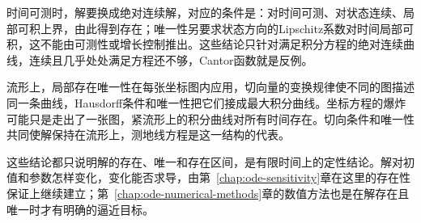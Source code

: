 时间可测时，解要换成绝对连续解，对应的条件是：对时间可测、对状态连续、局部可积上界，由此得到存在；唯一性另要求状态方向的Lipschitz系数对时间局部可积，这不能由可测性或增长控制推出。这些结论只针对满足积分方程的绝对连续曲线，连续且几乎处处满足方程还不够，Cantor函数就是反例。

流形上，局部存在唯一性在每张坐标图内应用，切向量的变换规律使不同的图描述同一条曲线，Hausdorff条件和唯一性把它们接成最大积分曲线。坐标方程的爆炸可能只是走出了一张图，紧流形上的积分曲线对所有时间存在。切向条件和唯一性共同使解保持在流形上，测地线方程是这一结构的代表。

这些结论都只说明解的存在、唯一和存在区间，是有限时间上的定性结论。解对初值和参数怎样变化，变化能否求导，由第~\ref{chap:ode-sensitivity}章在这里的存在性保证上继续建立；第~\ref{chap:ode-numerical-methods}章的数值方法也是在解存在且唯一时才有明确的逼近目标。
